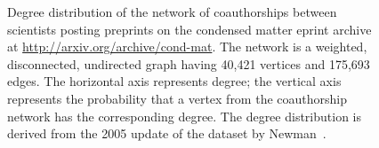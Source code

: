 \begin{figure}[!htbp]
\centering
{}
\qquad
{}
\caption{Degree distribution of the network of coauthorships between
  scientists posting preprints on the condensed matter eprint archive
  at \url{http://arxiv.org/archive/cond-mat}. The network is a
  weighted, disconnected, undirected graph having 40,421 vertices and
  175,693 edges. The horizontal axis represents degree; the vertical
  axis represents the probability that a vertex from the coauthorship
  network has the corresponding degree. The degree distribution is
  derived from the 2005 update of the dataset by
  Newman~\cite{Newman2001b}.}
\label{fig:random_graphs:degree_distribution:condensed_matter_collaboration}
\end{figure}


